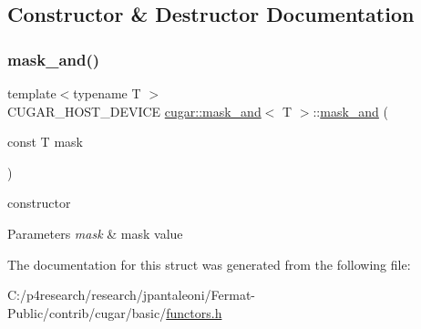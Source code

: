 \subsection{Constructor \& Destructor Documentation}
\mbox{\label{structcugar_1_1mask__and_ad7325adf41f11077c85317fbcd75e848}} 
\subsubsection{\texorpdfstring{mask\+\_\+and()}{mask\_and()}}
{\footnotesize\ttfamily template$<$typename T $>$ \\
C\+U\+G\+A\+R\+\_\+\+H\+O\+S\+T\+\_\+\+D\+E\+V\+I\+CE \hyperlink{structcugar_1_1mask__and}{cugar\+::mask\+\_\+and}$<$ T $>$\+::\hyperlink{structcugar_1_1mask__and}{mask\+\_\+and} (\begin{DoxyParamCaption}\item[{const T}]{mask }\end{DoxyParamCaption})\hspace{0.3cm}{\ttfamily [inline]}}

constructor


\begin{DoxyParams}{Parameters}
{\em mask} & mask value \\
\hline
\end{DoxyParams}


The documentation for this struct was generated from the following file\+:\begin{DoxyCompactItemize}
\item 
C\+:/p4research/research/jpantaleoni/\+Fermat-\/\+Public/contrib/cugar/basic/\hyperlink{functors_8h}{functors.\+h}\end{DoxyCompactItemize}
